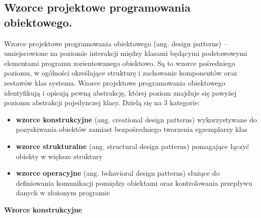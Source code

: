 \documentclass[a4paper,12pt,oneside]{book}
\begin{document}
			\newpage\subsection{Wzorce projektowe programowania obiektowego.}
				Wzorce projektowe programowania obiektowego (ang. design patterns) – umiejscowione na poziomie interakcji między klasami będącymi podstawowymi elementami programu zorientowanego obiektowo. Są to wzorce pośredniego poziomu, w ogólności określające strukturę i zachowanie komponentów oraz zestawów klas systemu. Wzorce projektowe programowania obiektowego identyfikują i opisują pewną abstrakcję, której poziom znajduje się powyżej poziomu abstrakcji pojedynczej klasy.
                Dzielą się na 3 kategorie:
                \begin{itemize}
                        \item \textbf{wzorce konstrukcyjne} (ang. creational design patterns) wykorzystywane do pozyskiwania obiektów zamiast bezpośredniego tworzenia egzemplarzy klas
                        \item \textbf{wzorce strukturalne} (ang. structural design patterns) pomagające łączyć obiekty w większe struktury
                        \item \textbf{wzorce operacyjne} (ang. behavioral design patterns) służące do definiowania komunikacji pomiędzy obiektami oraz kontrolowania przepływu danych w złożonym programie
                \end{itemize}
                \textbf{Wzorce konstrukcyjne}
\end{document}
